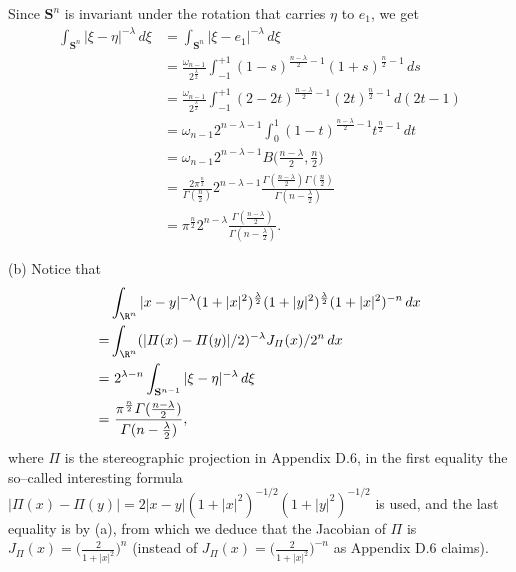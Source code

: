 \begin{itemize}
Since $\mathbf{S}^n$ is invariant 
under the rotation that carries $\eta$ to $e_1$, we get
\begin{align*}
    \int_{\mathbf{S}^n}|\xi-\eta|^{-\lambda}\,d\xi
    &=\int_{\mathbf{S}^n}|\xi-e_1|^{-\lambda}\,d\xi\\
    &=\frac{\omega_{n-1}}{2^\frac{\lambda}{2}}\int_{-1}^{+1}(1-s)^{\frac{n-\lambda}{2}-1}(1+s)^{\frac{n}{2}-1}\,ds\\
    &=\frac{\omega_{n-1}}{2^\frac{\lambda}{2}}\int_{-1}^{+1}(2-2t)^{\frac{n-\lambda}{2}-1}(2t)^{\frac{n}{2}-1}\,d(2t-1)\\
    &=\omega_{n-1}2^{n-\lambda-1}\int_{0}^{1}(1-t)^{\frac{n-\lambda}{2}-1}t^{\frac{n}{2}-1}\,dt\\
    &=\omega_{n-1}2^{n-\lambda-1}B\Big(\frac{n-\lambda}{2},\frac{n}{2}\Big)\\
    &=\frac{2\pi^\frac{n}{2}}{\varGamma(\frac{n}{2})}2^{n-\lambda-1}
    \frac{\varGamma(\frac{n-\lambda}{2})\varGamma(\frac{n}{2})}{\varGamma(n-\frac{\lambda}{2})}\\
    &=\pi^\frac{n}{2}2^{n-\lambda}\frac{\varGamma(\frac{n-\lambda}{2})}{\varGamma(n-\frac{\lambda}{2})}.
\end{align*}

(b) Notice that
\begin{align*}
    &\int_{\R^n}|x-y|^{-\lambda}(1+|x|^2)^\frac{\lambda}{2}(1+|y|^2)^\frac{\lambda}{2}(1+|x|^2)^{-n}\,dx\\
    =&\int_{\R^n}(|\varPi(x)-\varPi(y)|/2)^{-\lambda}J_\varPi(x)/2^n\,dx\\
    =&\ 2^{\lambda-n}\int_{\mathbf{S}^{n-1}}|\xi-\eta|^{-\lambda}\,d\xi\\
    =&\ \frac{\pi^\frac{n}{2}\varGamma(\frac{n-\lambda}{2})}{\varGamma(n-\frac{\lambda}{2})},
\end{align*}
where $\varPi$ is the stereographic projection in Appendix D.6, 
in the first equality the so--called interesting formula 
$|\varPi(x)-\varPi(y)|=2|x-y|(1+|x|^2)^{-1/2}(1+|y|^2)^{-1/2}$ is used, 
and the last equality is by (a), from which we deduce that 
the Jacobian of $\varPi$ is $J_\varPi(x)=\big(\frac{2}{1+|x|^2}\big)^n$ 
(instead of $J_\varPi(x)=\big(\frac{2}{1+|x|^2}\big)^{-n}$ as Appendix D.6 claims).


\end{itemize}

